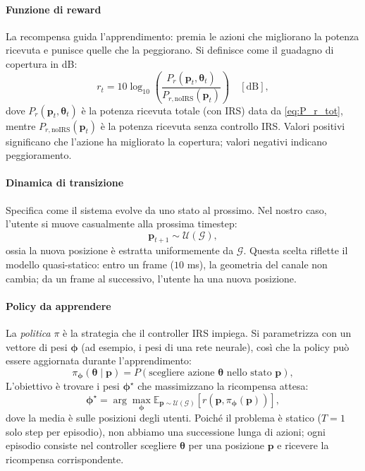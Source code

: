 \documentclass[12pt,a4paper]{report}
\begin{document}
\paragraph{Funzione di reward}
La recompensa guida l'apprendimento: premia le azioni che migliorano
la potenza ricevuta e punisce quelle che la peggiorano. Si definisce
come il guadagno di copertura in dB:
\begin{equation}
  r_t = 10\log_{10} \left( \frac{P_r(\mathbf{p}_t,
  \boldsymbol{\theta}_t)}{P_{r,\mathrm{noIRS}}(\mathbf{p}_t)} \right)
  \quad [\text{dB}],
  \label{eq:reward_RL}
\end{equation}
dove $P_r(\mathbf{p}_t, \boldsymbol{\theta}_t)$ è la potenza ricevuta
totale (con IRS) data da \eqref{eq:P_r_tot}, mentre
$P_{r,\mathrm{noIRS}}(\mathbf{p}_t)$ è la potenza ricevuta senza
controllo IRS. Valori positivi significano che l'azione ha migliorato
la copertura; valori negativi indicano peggioramento.

\paragraph{Dinamica di transizione}
Specifica come il sistema evolve da uno stato al prossimo. Nel nostro
caso, l'utente si muove casualmente alla prossima timestep:
\begin{equation}
  \mathbf{p}_{t+1} \sim \mathcal{U}(\mathcal{G}),
\end{equation}
ossia la nuova posizione è estratta uniformemente da $\mathcal{G}$.
Questa scelta riflette il modello quasi-statico: entro un frame
($10$ ms), la geometria del canale non cambia; da un frame al
successivo, l'utente ha una nuova posizione.

\paragraph{Policy da apprendere}
La \emph{politica} $\pi$ è la strategia che il controller IRS
impiega. Si parametrizza con un vettore di pesi $\boldsymbol{\phi}$
(ad esempio, i pesi di una rete neurale), così che la policy può
essere aggiornata durante l'apprendimento:
\begin{equation}
  \pi_{\boldsymbol{\phi}}(\boldsymbol{\theta} \mid \mathbf{p}) =
  P(\text{scegliere azione } \boldsymbol{\theta} \text{ nello stato }
  \mathbf{p}),
\end{equation}
L'obiettivo è trovare i pesi $\boldsymbol{\phi}^{\star}$ che massimizzano
la ricompensa attesa:
\begin{equation}
  \boldsymbol{\phi}^{\star} =
  \arg\max_{\boldsymbol{\phi}} \mathbb{E}_{\mathbf{p} \sim
  \mathcal{U}(\mathcal{G})} \left[ r(\mathbf{p},
  \pi_{\boldsymbol{\phi}}(\mathbf{p})) \right],
\end{equation}
dove la media è sulle posizioni degli utenti. Poiché il problema è
statico ($T=1$ solo step per episodio), non abbiamo una successione
lunga di azioni; ogni episodio consiste nel controller scegliere
$\boldsymbol{\theta}$ per una posizione $\mathbf{p}$ e ricevere la
ricompensa corrispondente.
\end{document}
